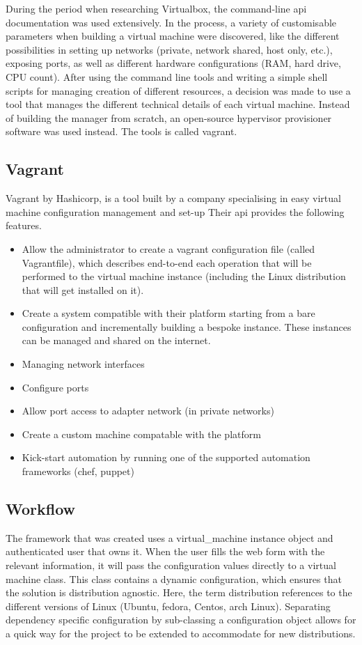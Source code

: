 \documentclass{article}
\begin{document}
During the period when researching Virtualbox, the command-line \gls{api} documentation was used extensively. In the process, a variety of customisable parameters when building a virtual machine were discovered, like the different possibilities in setting up networks (private, network shared, host only, etc.), exposing ports, as well as different hardware configurations (RAM, hard drive, CPU count). After using the command line tools and writing a simple shell scripts for managing creation of different resources, a decision was made to use a tool that manages the different technical details of each virtual machine. Instead of building the manager from scratch, an open-source hypervisor provisioner software was used instead. The tools is called \gls{vagrant}.

\subsection{Vagrant}
Vagrant by Hashicorp, is a tool built by a company specialising in easy virtual machine configuration management and set-up Their \gls{api} provides the following features.

\begin{itemize}
	\item
	Allow the administrator to create a \gls{vagrant} configuration file (called Vagrantfile), which describes end-to-end each operation that will be performed to the virtual machine instance (including the Linux distribution that will get installed on it).
	\item
	Create a system compatible with their platform starting from a bare configuration and incrementally building a bespoke instance. These instances can be managed and shared on the internet.
	\item
	Managing network interfaces
	\item
	Configure ports
	\item
	Allow port access to adapter network (in private networks)
	\item
	Create a custom machine compatable with the platform
	\item
	Kick-start automation by running one of the supported automation frameworks (chef, puppet)
\end{itemize}

\subsection{Workflow}
The framework that was created uses a \gls{virtual_machine} instance object and authenticated user that owns it. When the user fills the web form with the relevant information, it will pass the configuration values directly to a virtual machine class. This class contains a dynamic configuration, which ensures that the solution is distribution agnostic. Here, the term distribution references to the different versions of Linux (Ubuntu, fedora, Centos, arch Linux). Separating dependency specific configuration by sub-classing a configuration object allows for a quick way for the project to be extended to accommodate for new distributions.
\end{document}

